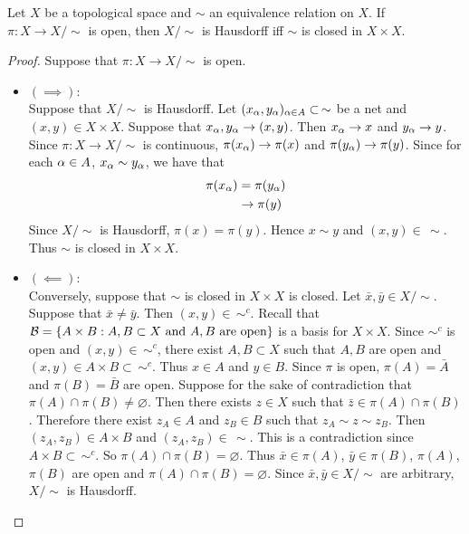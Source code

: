 \documentclass{book}
\begin{document}
	\begin{ex}
		Let $X$ be a topological space and $\sim$ an equivalence relation on $X$. If $\pi: X \rightarrow X / \sim$ is open, then $X / \sim$ is Hausdorff iff $\sim$ is closed in $X \times X$.
	\end{ex}
	
	\begin{proof}
		Suppose that $\pi:X \rightarrow X / \sim$ is open. 
		\begin{itemize}
			\item $(\implies)$: \\
			Suppose that $X/\sim$ is Hausdorff. Let $(x_{\alpha}, y_{\alpha})_{\alpha \in A} \subset \, \sim$ be a net and $(x,y) \in X \times X$. Suppose that $x_{\alpha}, y_{\alpha} \rightarrow (x,y)$. Then $x_{\alpha} \rightarrow x$ and $y_{\alpha} \rightarrow y$. Since $\pi:X \rightarrow X / \sim$ is continuous, $\pi(x_{\alpha}) \rightarrow \pi(x)$ and $\pi(y_{\alpha}) \rightarrow \pi(y)$. Since for each $\alpha \in A$, $x_{\alpha} \sim y_{\alpha}$, we have that 
			\begin{align*}
				\pi(x_{\alpha}) 
				& = \pi(y_{\alpha})\\
				& \rightarrow \pi(y)
			\end{align*}
			Since $X/ \sim$ is Hausdorff, $\pi(x) = \pi(y)$. Hence $x \sim y$ and $(x,y) \in \, \sim$. Thus $\sim$ is closed in $X \times X$.\\
			\item $(\impliedby)$: \\
			Conversely, suppose that $\sim$ is closed in $X \times X$ is closed. Let $\bar{x}, \bar{y} \in X / \sim$. Suppose that $\bar{x} \neq \bar{y}$. Then $(x,y) \in \, \sim^c$. Recall that $\mathcal{B} =\{A \times B: A,B \subset X \text{ and $A, B$ are open} \}$ is a basis for $X \times X$. Since  $\sim^c$ is open and $(x,y) \in \, \sim^c$, there exist $A,B \subset X$ such that $A,B$ are open and $(x,y) \in A \times B \subset \, \sim^c$. Thus $x \in A$ and $y \in B$. Since $\pi$ is open, $\pi(A) = \bar{A}$ and $\pi(B) = \bar{B}$ are open. Suppose for the sake of contradiction that $\pi(A) \cap \pi(B) \neq \varnothing$. Then there exists $z \in X$ such that $\bar{z} \in \pi(A) \cap \pi(B)$. Therefore there exist $z_A \in A$ and $z_B \in B$ such that $z_A \sim z \sim z_B$. Then $(z_A, z_B) \in A \times B$ and $(z_A, z_B) \in \, \sim$. This is a contradiction since $A \times B \subset \, \sim^c$. So $\pi(A) \cap \pi(B) = \varnothing$. Thus $\bar{x} \in \pi(A)$, $\bar{y} \in \pi(B)$, $\pi(A)$, $\pi(B)$ are open and $\pi(A) \cap \pi(B) = \varnothing$. Since $\bar{x}, \bar{y} \in X / \sim$ are arbitrary, $X / \sim$ is Hausdorff.
		\end{itemize}
	\end{proof}
\end{document}
